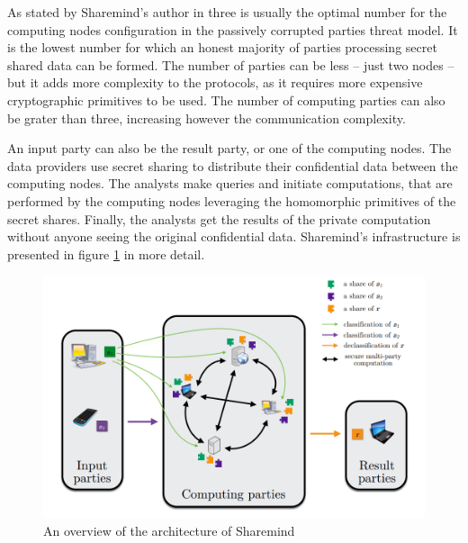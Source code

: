 As stated by Sharemind's author in \cite{bogdanov2013sharemind} three is usually the optimal number for the computing nodes configuration in the passively corrupted parties threat model. It is the lowest number for which an honest majority of parties processing secret shared data can be formed. The number of parties can be less -- just two nodes -- but it adds more complexity to the protocols, as it requires more expensive cryptographic primitives to be used. The number of computing parties can also be grater than three, increasing however the communication complexity.

An input party can also be the result party, or one of the computing nodes.
The data providers use secret sharing to distribute their confidential data between the computing nodes.
The analysts make queries and initiate computations, that are performed by the computing nodes leveraging the homomorphic primitives of the secret shares.
Finally, the analysts get the results of the private computation without anyone seeing the original confidential data.
Sharemind's infrastructure is presented in figure \ref{f:sharemind} in more detail.


\begin{figure}[th]
  \centering
  \includegraphics[width=\linewidth]{figures/sharemind_infrastructure.png}
  \caption{An overview of the architecture of Sharemind}\label{f:sharemind}
\end{figure}






